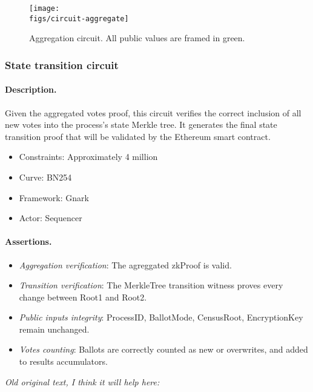 \begin{figure}[h]
	\centerline{\texttt{[image: \\figs/circuit-aggregate]}}
	\caption{Aggregation circuit. All public values are framed in green.}
	\label{fig:circuit-aggregate}
\end{figure}


\subsubsection{State transition circuit}

\paragraph{Description.} Given the aggregated votes proof, this circuit verifies the correct inclusion of all new votes into the process's state Merkle tree. It generates the final state transition proof that will be validated by the Ethereum smart contract.

\begin{itemize}
	\item Constraints: Approximately 4 million
	\item Curve: BN254
	\item Framework: Gnark
	\item Actor: Sequencer
\end{itemize}

\paragraph{Assertions.}

\begin{itemize}
	\item \emph{Aggregation verification}: The agreggated zkProof is valid.
	\item \emph{Transition verification}: The MerkleTree transition witness proves every change between Root1 and Root2.
	\item \emph{Public inputs integrity}: ProcessID, BallotMode, CensusRoot, EncryptionKey remain unchanged.
	\item \emph{Votes counting}: Ballots are correctly counted as new or overwrites, and added to results accumulators.
\end{itemize}


\noi \textit{Old original text, I think it will help here:}

